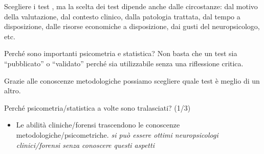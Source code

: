 \documentclass[
  ignorenonframetext,
  aspectratio=169,
]{beamer}
\providecommand{\tightlist}{%
  \setlength{\itemsep}{0pt}\setlength{\parskip}{0pt}}
\begin{document}
\begin{frame}{Scegliere i test}
\label{scegliere-i-test}
\setlength{\fboxrule}{1mm}
, ma la scelta dei test dipende anche  dalle circostanze: dal motivo della valutazione, dal contesto clinico, dalla patologia trattata, dal tempo a disposizione, dalle risorse economiche a disposizione, dai gusti del
neuropsicologo, etc.
\end{frame}

\begin{frame}{Perché sono importanti psicometria e statistica?}
\label{perchuxe9-sono-importanti-psicometria-e-statistica}
Non basta che un test sia ``pubblicato'' o ``validato'' perché sia
utilizzabile senza una riflessione critica.

\vspace{2em}

Grazie alle conoscenze metodologiche possiamo scegliere quale test è
meglio di un altro.

\pause
\vspace{2em}

\begin{center}
\end{center}
\end{frame}

\begin{frame}{Perché psicometria/statistica a volte sono tralasciati?
(1/3)}
\label{perchuxe9-psicometriastatistica-a-volte-sono-tralasciati-13}
\begin{itemize}
\tightlist
\item
  Le abilità cliniche/forensi trascendono le conoscenze
  metodologiche/psicometriche. \emph{si può essere ottimi neuropsicologi
  clinici/forensi senza conoscere questi aspetti}
\end{itemize}
\end{frame}
\end{document}
